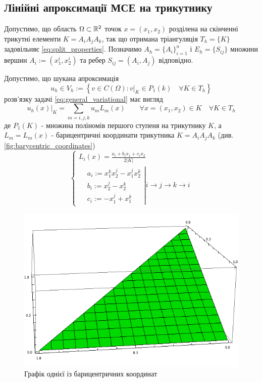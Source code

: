 \subsection{Лінійні апроксимації МСЕ на трикутнику}

Допустимо, що область $\Omega \subset \mathbb{R}^2$ точок $x = (x_1, x_2)$ розділена на скінченні трикутні елементи $K = A_iA_jA_k$,
	так що отримана тріангуляція $T_h = \lbrace K \rbrace$ задовільняє
\eqref{eq:split_properties}.
Позначимо $A_h = \lbrace A_i \rbrace_{i=1}^n$ і $E_h = \lbrace S_{ij} \rbrace$ множини вершин $A_i := (x_1^i, x_2^i)$ та ребер $S_{ij} = (A_i, A_j)$ відповідно.

Допустимо, що шукана апроксимація
\begin{equation}
	u_h \in V_h := \left\lbrace v \in C(\Omega) : v|_K \in P_1(k) \quad \forall K \in T_h \right\rbrace
\end{equation}
%
розв'язку задачі \eqref{eq:general_variational} має вигляд
%
\begin{equation}\label{eq:appr_kind}
	u_h(x)|_K = \sum \limits_{m=i,j,k} u_m L_m (x) \qquad \forall x=(x_1, x_2) \in K \quad \forall K \in T_h
\end{equation}
%
де $P_1(K)$ - множина поліномів першого ступеня на трикутнику $K$, а $L_m = L_m(x)$ -
	барицентричні координати трикутника $K = A_i A_j A_k$ (див. \autoref{fig:barycentric_coordinates})
%
\begin{equation}\label{eq:barycentric_coord}
	\begin{cases}
		L_i(x) = \frac{a_i + b_i x_1 + c_i x_2}{2 |K|} \\
			\left.
			\begin{split}
				&a_i := x_1^k x_2^j - x_1^j x_2^k \\
				&b_i := x_2^j -x_2^k \\
				&c_i := -x_1^j+x_1^k
			\end{split}
			\right|
			i \to j \to k \to i
	\end{cases}
\end{equation}
%
\begin{figure}[H]
	\centering
    \includegraphics[scale=0.5]{images/barycentric}
    \caption{Графік однієї із барицентричних координат}
    \label{fig:barycentric_coordinates}
\end{figure}
